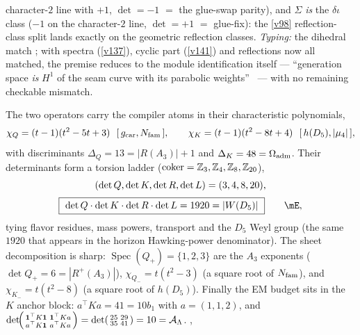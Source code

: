 \begin{keybox}
character-$2$ line with $+1$, $\det=-1$ $=$ the glue-swap parity), and $\Sigma$ \emph{is} the
$\delta\iota$ class ($-1$ on the character-$2$ line, $\det=+1$ $=$ glue-fix): the \vref{v98}
reflection-class split lands exactly on the geometric reflection classes. \emph{Typing:} the dihedral
match \mE; with spectra (\vref{v137}), cyclic part (\vref{v141}) and reflections now all matched, the
premise reduces to the module identification itself --- ``generation space \emph{is} $H^1$ of the seam
curve with its parabolic weights'' \mC\ --- with no remaining checkable mismatch.
\end{keybox}

\begin{winbox}
The two operators carry the compiler atoms in their characteristic polynomials,
\begin{equation}
  \chi_Q=(t-1)(t^2-5t+3)\ \ [\,\gcar,\Nfam\,],\qquad
  \chi_K=(t-1)(t^2-8t+4)\ \ [\,h(D_5),|\mu_4|\,],
\end{equation}
with discriminants $\Delta_Q=13=|R(A_3)|{+}1$ and $\Delta_K=48=\Omega_{\mathrm{adm}}$. Their determinants form a torsion
ladder ($\operatorname{coker}=\mathbb{Z}_3,\mathbb{Z}_4,\mathbb{Z}_8,\mathbb{Z}_{20}$),
\begin{equation}
\begin{gathered}
  (\det Q,\det K,\det R,\det L)=(3,4,8,20),\\[2pt]
  \boxed{\ \det Q\cdot\det K\cdot\det R\cdot\det L=1920=|W(D_5)|\ }\qquad\mE ,
\end{gathered}
\end{equation}
tying flavor residues, mass powers, transport and the $D_5$ Weyl group (the same $1920$ that appears in the
horizon Hawking-power denominator). The sheet decomposition is sharp: $\operatorname{Spec}(Q_+)=\{1,2,3\}$
are the $A_3$ exponents ($\det Q_+=6=|R^+(A_3)|$), $\chi_{Q_-}=t(t^2-3)$ (a square root of $N_{\mathrm{fam}}$), and
$\chi_{K_-}=t(t^2-8)$ (a square root of $h(D_5)$). Finally the EM budget sits in the $K$ anchor block:
$a^\top K a=41=10b_1$ with $a=(1,1,2)$, and $\det\!\begin{psmallmatrix}\mathbf1^\top K\mathbf1&\mathbf1^\top Ka\\ a^\top K\mathbf1&a^\top Ka\end{psmallmatrix}=\det\begin{psmallmatrix}25&29\\35&41\end{psmallmatrix}=10=\mathcal A_\Lambda$.
, 
\smallskip\\

\end{winbox}
